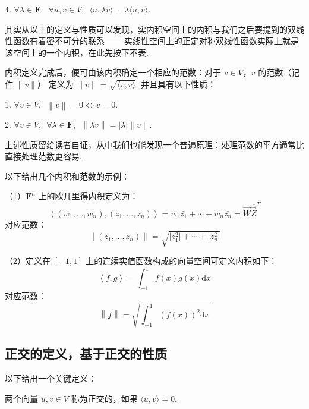 4. $\forall \lambda \in \mathbf{F}, \enspace \forall u, v \in V, \enspace \langle u, \lambda v \rangle = \overline{\lambda} \langle u, v \rangle$.

其实从以上的定义与性质可以发现，实内积空间上的内积与我们之后要提到的双线性函数有着密不可分的联系——
实线性空间上的正定对称双线性函数实际上就是该空间上的一个内积，在此先按下不表. 

\vspace{2ex} 

内积定义完成后，便可由该内积确定一个相应的范数：对于 $v \in V$，$v$ 的范数（记作 $ \lVert v \rVert $）
定义为 $ \lVert v \rVert = \sqrt{\langle v, v \rangle}$. \enspace 并且具有以下性质：

1. $\forall v \in V, \enspace \left\lVert v \right\rVert = 0 \Leftrightarrow v = 0$.

2. $\forall v \in V, \enspace \forall \lambda \in \mathbf{F}, 
\enspace \left\lVert \lambda v \right\rVert  = \left\lvert \lambda \right\rvert \lVert v \rVert$.

上述性质留给读者自证，从中我们也能发现一个普遍原理：处理范数的平方通常比直接处理范数更容易. 

\vspace{2ex} 

以下给出几个内积和范数的示例：

\begin{example}
    \textup{（1）}$\mathbf{F}^{n}$ 上的欧几里得内积定义为：
    \[\left\langle (w_1, \ldots, w_n), (z_1, \ldots, z_n)\right\rangle = w_1\overline{z_1} + \cdots + w_n\overline{z_n} = \vec{W}\overline{\vec{Z}}^{T}\]
    对应范数：
    \[\left\lVert (z_1, \ldots, z_n) \right\rVert  = \sqrt{\lvert z^2_1 \rvert + \cdots + \lvert z^2_n \rvert}\]

    \textup{（2）}定义在 $ \left[-1, 1\right] $ 上的连续实值函数构成的向量空间可定义内积如下：
    \[\left\langle f, g\right\rangle = \int_{-1}^1f(x)g(x)\mathrm{d}x\]
    对应范数：
    \[\left\lVert f \right\rVert = \sqrt{\int_{-1}^1(f(x))^2\mathrm{d}x}\]
\end{example}

\subsection{正交的定义，基于正交的性质}

以下给出一个关键定义：

\begin{definition}
    两个向量 $u, v \in V$ 称为正交的，如果 $\langle u, v\rangle = 0$.
\end{definition}

